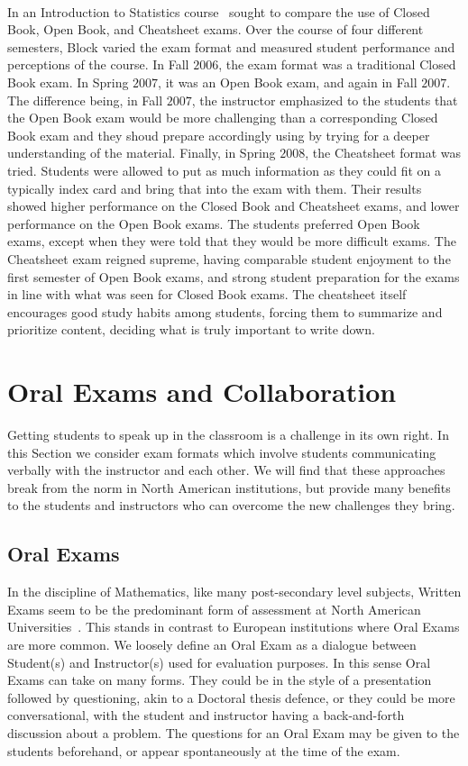 \documentclass[12pt]{article}
\begin{document}
\paragraph{}
In an Introduction to Statistics course~\cite{block2012discussion} sought to compare the use of Closed Book, Open Book, and Cheatsheet exams. Over the course of four different semesters, Block varied the exam format and measured student performance and perceptions of the course. In Fall $2006$, the exam format was a traditional Closed Book exam. In Spring $2007$, it was an Open Book exam, and again in Fall $2007$. The difference being, in Fall $2007$, the instructor emphasized to the students that the Open Book exam would be more challenging than a corresponding Closed Book exam and they shoud prepare accordingly using by trying for a deeper understanding of the material. Finally, in Spring $2008$, the Cheatsheet format was tried. Students were allowed to put as much information as they could fit on a typically index card and bring that into the exam with them. Their results showed higher performance on the Closed Book and Cheatsheet exams, and lower performance on the Open Book exams. The students preferred Open Book exams, except when they were told that they would be more difficult exams. The Cheatsheet exam reigned supreme, having comparable student enjoyment to the first semester of Open Book exams, and strong student preparation for the exams in line with what was seen for Closed Book exams. The cheatsheet itself encourages good study habits among students, forcing them to summarize and prioritize content, deciding what is truly important to write down.

\section{Oral Exams and Collaboration}\label{sec:communication}
Getting students to speak up in the classroom is a challenge in its own right. In this Section we consider exam formats which involve students communicating verbally with the instructor and each other. We will find that these approaches break from the norm in North American institutions, but provide many benefits to the students and instructors who can overcome the new challenges they bring.
\subsection{Oral Exams}\label{subsec:oral}
In the discipline of Mathematics, like many post-secondary level subjects, Written Exams seem to be the predominant form of assessment at North American Universities~\cite{gold1999assessment}. This stands in contrast to European institutions where Oral Exams are more common.  We loosely define an Oral Exam as a dialogue between Student(s) and Instructor(s) used for evaluation purposes. In this sense Oral Exams can take on many forms. They could be in the style of a presentation followed by questioning, akin to a Doctoral thesis defence, or they could be more conversational, with the student and instructor having a back-and-forth discussion about a problem. The questions for an Oral Exam may be given to the students beforehand, or appear spontaneously at the time of the exam.
\end{document}
